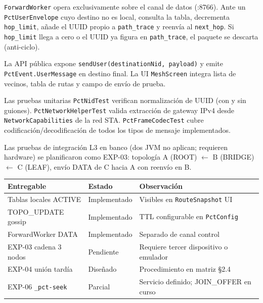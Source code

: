 \texttt{ForwardWorker} opera exclusivamente sobre el canal de datos (:8766). Ante un \texttt{PctUserEnvelope} cuyo destino no es local, consulta la tabla, decrementa \texttt{hop\_limit}, añade el UUID propio a \texttt{path\_trace} y reenvía al \texttt{next\_hop}. Si \texttt{hop\_limit} llega a cero o el UUID ya figura en \texttt{path\_trace}, el paquete se descarta (anti-ciclo).

La API pública expone \texttt{sendUser(destinationNid, payload)} y emite \texttt{PctEvent.UserMessage} en destino final. La UI \texttt{MeshScreen} integra lista de vecinos, tabla de rutas y campo de envío de prueba.


Las pruebas unitarias \texttt{PctNidTest} verifican normalización de UUID (con y sin guiones). \texttt{PctNetworkHelperTest} valida extracción de gateway IPv4 desde \texttt{NetworkCapabilities} de la red STA. \texttt{PctFrameCodecTest} cubre codificación/decodificación de todos los tipos de mensaje implementados.

Las pruebas de integración L3 en banco (dos JVM no aplican; requieren hardware) se planificaron como EXP-03: topología A (ROOT) $\leftarrow$ B (BRIDGE) $\leftarrow$ C (LEAF), envío DATA de C hacia A con reenvío en B.


\begin{center}
\small
\begin{tabular}{@{}p{3.2cm}p{2.2cm}p{6.6cm}@{}}
\hline
\textbf{Entregable} & \textbf{Estado} & \textbf{Observación} \\
\hline
Tablas locales ACTIVE & Implementado & Visibles en \texttt{RouteSnapshot} UI \\
TOPO\_UPDATE gossip & Implementado & TTL configurable en \texttt{PctConfig} \\
ForwardWorker DATA & Implementado & Separado de canal control \\
EXP-03 cadena 3 nodos & Pendiente & Requiere tercer dispositivo o emulador \\
EXP-04 unión tardía & Diseñado & Procedimiento en matriz §2.4 \\
EXP-06 \texttt{\_pct-seek} & Parcial & Servicio definido; JOIN\_OFFER en curso \\
\hline
\end{tabular}
\end{center}


